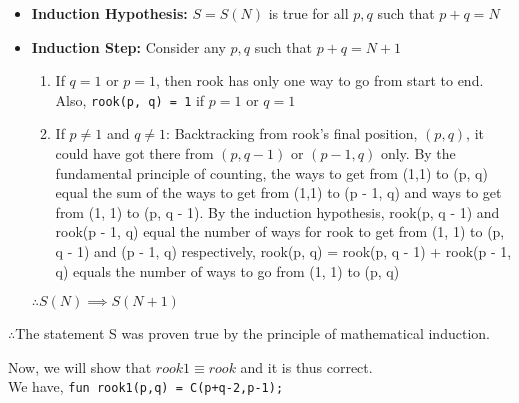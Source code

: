 \documentclass[answers]{exam}
\begin{document}
\begin{questions}
{\begin{parts}
{\begin{solution}
\begin{itemize}
                            \item{
                                \textbf{Induction Hypothesis: } \(S = S(N)\) is true for all \(p, q\) such that \(p + q = N\)
                            }

                            \item{
                                \textbf{Induction Step: } Consider any \(p, q\) such that \(p + q = N + 1\)
                                \begin{enumerate}
                                    \item{
                                        If \(q = 1\) or \(p = 1\), then rook has only one way to go from start to end.
                                        Also, \lstinline{rook(p, q) = 1} if \(p = 1\) or \(q = 1\)
                                    }
                                    \item{
                                        If \(p \neq 1\) and \(q \neq 1\): Backtracking from rook's final position, \((p, q)\),
                                        it could have got there from \((p, q - 1)\) or \((p -1, q)\) only.
                                        By the fundamental principle of counting, the ways to get from (1,1) to (p, q) equal
                                        the sum of the ways to get from (1,1) to (p - 1, q) and ways to get from (1, 1) to
                                        (p, q - 1). By the induction hypothesis, rook(p, q - 1) and rook(p - 1, q) equal 
                                        the number of ways for rook to get from (1, 1) to (p, q - 1) and (p - 1, q) respectively,
                                        rook(p, q) = rook(p, q - 1) + rook(p - 1, q) equals the number of ways to go from (1, 1) to (p, q)
                                    }
                                \end{enumerate}
                                \(\therefore S(N) \implies S(N + 1)\)
                            }
                        \end{itemize}
                    \(\therefore\)The statement S was proven true by the principle of mathematical induction.

                    Now, we will show that \(rook1 \equiv rook\) and it is thus correct.\\
                    We have, \lstinline{fun rook1(p,q) = C(p+q-2,p-1);} 


\end{solution}}
\end{parts}}
\end{questions}
\end{document}
